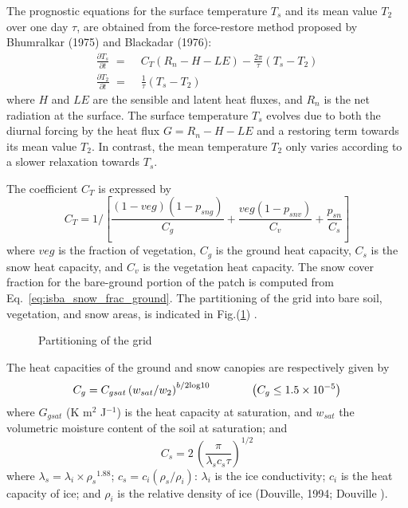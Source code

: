 The prognostic equations for the surface temperature
$T_s$ and its mean value $T_2$ over one day $\tau$,
are obtained from the force-restore method proposed by
Bhumralkar (1975)\nocite{Bhumralkar1975} and Blackadar (1976)\nocite{Blackadar1976}:
%
\begin{align} 
\label{eqTs}
\frac{\partial T_s}{\partial t} \,\, =& \,\,
C_T (R_n-H-LE) - \frac{2\pi}{\tau} \left(T_s-T_2\right)   
\\
\label{eqT2}
\frac{\partial T_2 }{ \partial t} \,\, =& \,\, \frac{1}{\tau} \left(T_s-T_2\right)
\end{align} 
%
where $H$ and
$LE$ are the sensible and latent heat fluxes, and
$R_n$ is the net radiation at the surface.
The surface temperature $T_s$ evolves due to both the
diurnal forcing by the heat flux $G = R_n-H-LE$ and
a restoring term towards its mean value $T_2$.
In contrast, the mean temperature $T_2$ only varies
according to a slower relaxation towards $T_s$.

The coefficient $C_T$ is expressed by
%
\begin{equation}
C_T=1 / \left[  \frac{(1-veg)(1-p_{sng}) }{ C_g}
    +       \frac{ veg(1-p_{snv}) }{ C_v }
    +       \frac{ p_{sn} }{ C_s } \right]
\end{equation}
where $veg$ is the fraction of vegetation, $C_g$ is the ground heat capacity,
$C_s$ is the snow heat capacity, and $C_v$ is the vegetation heat
capacity.
The snow cover fraction for the bare-ground 
portion of the patch is computed from Eq.~\ref{eq:isba_snow_frac_ground}.
%
The partitioning of the grid into bare soil, vegetation, and snow areas,
is indicated in Fig.(\ref{isba1}) .

\begin{figure}[h]
\begin{center}
\caption{Partitioning of the grid \label{isba1}}
\end{center}
\end{figure}

The heat capacities of the ground and snow canopies are
respectively given by
%
\begin{equation}
C_g=C_{gsat} \left( w_{sat}/w_2 \right)^
{b / 2{\rm log}10} 
\hskip.5in
\left( C_g \leq 1.5 \times 10^{-5}\right)
\end{equation}
%
where $G_{gsat}$ (K m$^2$ J$^{-1}$) is the heat capacity at
saturation, 
and $w_{sat}$ the
volumetric moisture content of the soil at saturation; and
%
\begin{equation}
C_s = 2 \, \left( \frac{\pi }{ \lambda_s c_s \tau}
\right)^{1/2}
\end{equation}
%
where $\lambda_s = \lambda_i \times {\rho_s}^{1.88}$;
$c_s = c_i (\rho_s / \rho_i)$:
$\lambda_i$ is the ice conductivity;
$c_i$ is the heat capacity
of ice; and $\rho_i$ is the relative density
of ice (Douville, 1994\nocite{Douville1994}; Douville \nocite{Douville1995}).
\\

